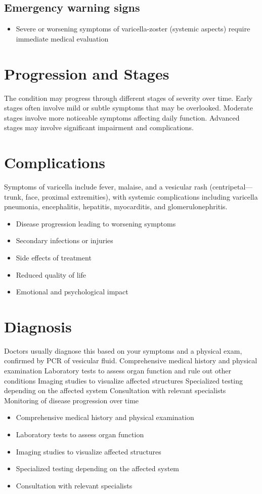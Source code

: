 \subsection{Emergency warning signs}
\begin{itemize}[noitemsep]
  \item Severe or worsening symptoms of varicella-zoster (systemic aspects) require immediate medical evaluation
\end{itemize}
\section{Progression and Stages}
The condition may progress through different stages of severity over time. Early stages often involve mild or subtle symptoms that may be overlooked. Moderate stages involve more noticeable symptoms affecting daily function. Advanced stages may involve significant impairment and complications.
\section{Complications}
Symptoms of varicella include fever, malaise, and a vesicular rash (centripetal---trunk, face, proximal extremities), with systemic complications including varicella pneumonia, encephalitis, hepatitis, myocarditis, and glomerulonephritis.

\begin{itemize}[noitemsep]
  \item Disease progression leading to worsening symptoms
  \item Secondary infections or injuries
  \item Side effects of treatment
  \item Reduced quality of life
  \item Emotional and psychological impact
\end{itemize}
\section{Diagnosis}
Doctors usually diagnose this based on your symptoms and a physical exam, confirmed by PCR of vesicular fluid. Comprehensive medical history and physical examination Laboratory tests to assess organ function and rule out other conditions Imaging studies to visualize affected structures Specialized testing depending on the affected system Consultation with relevant specialists Monitoring of disease progression over time

\begin{itemize}[noitemsep]
  \item Comprehensive medical history and physical examination
  \item Laboratory tests to assess organ function
  \item Imaging studies to visualize affected structures
  \item Specialized testing depending on the affected system
  \item Consultation with relevant specialists
\end{itemize}

